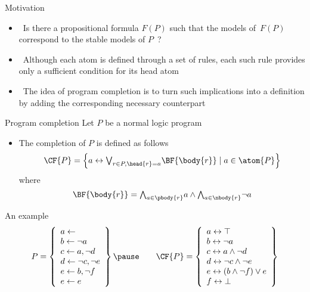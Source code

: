 \begin{frame}{Motivation}
  \bigskip
  \begin{itemize}
  \item<1->  \
    Is there a propositional formula $F(P)$ such that the models of~$F(P)$ correspond to the
    stable models of $P$~?
    \bigskip
  \item<2->  \
    Although each atom is defined through a set of rules,
    each such rule provides only a \alert{sufficient} condition for its head atom
    \medskip
  \item<3-> \structure{Idea} \
    The idea of program completion is to turn such implications into a definition
    by adding the corresponding \alert{necessary} counterpart
  \end{itemize}
\end{frame}
\begin{frame}{Program completion}
  \bigskip
  Let $P$ be a normal logic program
  \bigskip
  \begin{itemize}
  \item
    The \alert{completion}  of $P$ is defined as follows
    \[
    \CF{P}
    =
    \left\{a \leftrightarrow \textstyle{\bigvee_{r\in P, \head{r} = a}} \BF{\body{r}} \mid a\in\atom{P}\right\}
    \]
    where
    \[
    \BF{\body{r}}
    =
    \textstyle{\bigwedge_{a\in\pbody{r}}}      a
    \wedge
    \textstyle{\bigwedge_{a\in\nbody{r}}} \neg a
    \]
  \end{itemize}
\end{frame}
\begin{frame}{An example}
\[
P
=
\left\{
  \begin{array}{l}
    a \leftarrow                  \\
    b \leftarrow \neg a          \\
    c \leftarrow a, \neg d       \\
    d \leftarrow \neg c, \neg e \\
    e \leftarrow b, \neg f       \\
    e \leftarrow e
  \end{array}
\right\}
\pause\qquad
\CF{P}
=
\left\{
  \begin{array}{l}
    a \leftrightarrow \top                  \\
    b \leftrightarrow \neg{a}               \\
    c \leftrightarrow a\wedge \neg{d}       \\
    d \leftrightarrow \neg{c}\wedge \neg{e} \\
    e \leftrightarrow (b\wedge \neg{f}) \vee e\\
    f \leftrightarrow \bot
  \end{array}
\right\}
\]
\end{frame}
